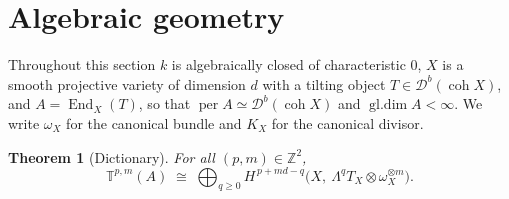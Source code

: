 \documentclass[11pt]{amsart}
\newtheorem{theorem}{Theorem}[section]
\theoremstyle{definition}
\newcommand{\T}{\mathbb{T}}
\newcommand{\gl}{\operatorname{gl.dim}}
\newcommand{\der}{\mathcal{D}}
\newcommand{\per}{\operatorname{per}}
\newcommand{\kk}{k}
\begin{document}
\section{Algebraic geometry}\label{sec:geom}

Throughout this section $\kk$ is algebraically closed of characteristic $0$,
$X$ is a smooth projective variety of dimension $d$ with a tilting object
$T\in\der^b(\operatorname{coh}X)$, and $A=\operatorname{End}_X(T)$, so that
$\per A\simeq\der^b(\operatorname{coh}X)$ and $\gl A<\infty$. We write
$\omega_X$ for the canonical bundle and $K_X$ for the canonical divisor.

\begin{theorem}[Dictionary]\label{thm:geom}
For all $(p,m)\in\mathbb Z^2$,
\[
\T^{p,m}(A)\;\cong\;\bigoplus_{q\ge0}
H^{\,p+md-q}\bigl(X,\ \Lambda^qT_X\otimes\omega_X^{\otimes m}\bigr).
\]
\end{theorem}
\end{document}
